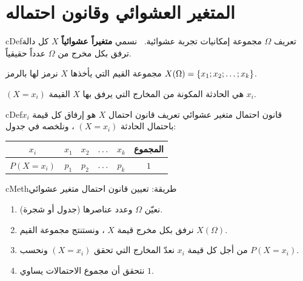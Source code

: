 \documentclass[12pt,a4paper]{article}
\newenvironment{BOX}[2]{\begin{otherlanguage}{english}\begin{arbox}{#1}{#2}}{\end{arbox}\end{otherlanguage}}
\newenvironment{tarif}[1][تعريف]{\begin{BOX}{cDef}{#1}}{\end{BOX}}
\newenvironment{tariqa}[1][طريقة]{\begin{BOX}{cMeth}{#1}}{\end{BOX}}
\newcommand{\ar}[1]{\foreignlanguage{arabic}{#1}}
\renewcommand{\dots}{\mathinner{\ldotp\ldotp\ldotp}}
\begin{document}
\section{المتغير العشوائي وقانون احتماله}
\begin{tarif}
$\Omega$ مجموعة إمكانيات تجربة عشوائية. \ نسمي \textbf{متغيراً عشوائياً} $X$ كل دالة ترفق بكل مخرج من $\Omega$ عدداً حقيقياً.\par
مجموعة القيم التي يأخذها $X$ نرمز لها بالرمز $X(\Omega)=\{x_1;x_2;\dots;x_k\}$.\par
$(X=x_i)$ هي الحادثة المكونة من المخارج التي يرفق بها $X$ القيمة $x_i$.
\end{tarif}
\begin{tarif}[قانون احتمال متغير عشوائي]
تعريف قانون احتمال $X$ هو إرفاق كل قيمة $x_i$ باحتمال الحادثة $(X=x_i)$ ، ونلخصه في جدول:
\begin{center}
\renewcommand{\arraystretch}{1.4}
\begin{tabular}{|C|c|c|c|c|c|}\hline
{}$x_i$ & $x_1$ & $x_2$ & $\dots$ & $x_k$ & \ar{المجموع}\\
\hline
$P(X=x_i)$ & $p_1$ & $p_2$ & $\dots$ & $p_k$ & $1$\\
\hline
\end{tabular}
\end{center}
\end{tarif}
\begin{tariqa}[طريقة: تعيين قانون احتمال متغير عشوائي]
\begin{enumerate}
\item نعيّن $\Omega$ وعدد عناصرها (جدول أو شجرة).
\item نرفق بكل مخرج قيمة $X$ ، ونستنتج مجموعة القيم $X(\Omega)$.
\item من أجل كل قيمة $x_i$ نعدّ المخارج التي تحقق $(X=x_i)$ ونحسب $P(X=x_i)$.
\item نتحقق أن مجموع الاحتمالات يساوي $1$.
\end{enumerate}
\end{tariqa}

\end{document}
